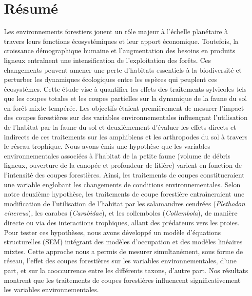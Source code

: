 \chapter*{Résumé}               %
\label{chap-resume}             %

Les environnements forestiers jouent un rôle majeur à l’échelle planétaire à travers leurs fonctions écosystémiques et leur apport économique. 
Toutefois, la croissance démographique humaine et l’augmentation des besoins en produits ligneux entraînent une intensification de l'exploitation des forêts. 
Ces changements peuvent amener une perte d'habitats essentiels à la biodiversité et perturber les dynamiques écologiques entre les espèces qui peuplent ces écosystèmes. 
Cette étude vise à quantifier les effets des traitements sylvicoles tels que les coupes totales et les coupes partielles sur la dynamique de la faune du sol en forêt mixte tempérée. 
Les objectifs étaient premièrement de mesurer l’impact des coupes forestières sur des variables environnementales influençant l’utilisation de l’habitat par la faune du sol 
et deuxièmement d’évaluer les effets directs et indirects de ces traitements sur les amphibiens et les arthropodes du sol à travers le réseau trophique. 
Nous avons émis une hypothèse que les variables environnementales associées à l’habitat de la petite faune (volume de débris ligneux, ouverture de la canopée et profondeur de litière) varient en fonction de l’intensité des coupes forestières. 
Ainsi, les traitements de coupes constitueraient une variable englobant les changements de conditions environnementales. 
Selon notre deuxième hypothèse, les traitements de coupe forestière entraîneraient une modification de l'utilisation de l'habitat 
par les salamandres cendrées (\textit{Plethodon cinereus}), les carabes (\textit{Carabidae}), et les collemboles (\textit{Collembola}), de manière directe ou via des interactions trophiques, 
allant des prédateurs vers les proies. 
Pour tester ces hypothèses, nous avons développé un modèle d’équations structurelles (SEM) intégrant des modèles d’occupation et des modèles linéaires mixtes. 
Cette approche nous a permis de mesurer simultanément, sous forme de réseau, l’effet des coupes forestières sur les variables environnementales, d’une part, et sur la cooccurrence entre les différents taxons, d’autre part. 
Nos résultats montrent que les traitements de coupes forestières influencent significativement les variables environnementales. 
